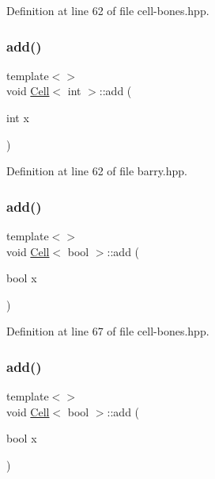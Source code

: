 Definition at line 62 of file cell-\/bones.\+hpp.

\mbox{\label{class_cell_a74cb069c7341de33354c396465818c2f}} 
\subsubsection{\texorpdfstring{add()}{add()}\hspace{0.1cm}{\footnotesize\ttfamily [7/9]}}
{\footnotesize\ttfamily template$<$$>$ \\
void \hyperlink{class_cell}{Cell}$<$ int $>$\+::add (\begin{DoxyParamCaption}\item[{int}]{x }\end{DoxyParamCaption})\hspace{0.3cm}{\ttfamily [inline]}}



Definition at line 62 of file barry.\+hpp.

\mbox{\label{class_cell_a0da6d3d39069cc22486442cc51c7685c}} 
\subsubsection{\texorpdfstring{add()}{add()}\hspace{0.1cm}{\footnotesize\ttfamily [8/9]}}
{\footnotesize\ttfamily template$<$$>$ \\
void \hyperlink{class_cell}{Cell}$<$ bool $>$\+::add (\begin{DoxyParamCaption}\item[{bool}]{x }\end{DoxyParamCaption})\hspace{0.3cm}{\ttfamily [inline]}}



Definition at line 67 of file cell-\/bones.\+hpp.

\mbox{\label{class_cell_a0da6d3d39069cc22486442cc51c7685c}} 
\subsubsection{\texorpdfstring{add()}{add()}\hspace{0.1cm}{\footnotesize\ttfamily [9/9]}}
{\footnotesize\ttfamily template$<$$>$ \\
void \hyperlink{class_cell}{Cell}$<$ bool $>$\+::add (\begin{DoxyParamCaption}\item[{bool}]{x }\end{DoxyParamCaption})\hspace{0.3cm}{\ttfamily [inline]}}



